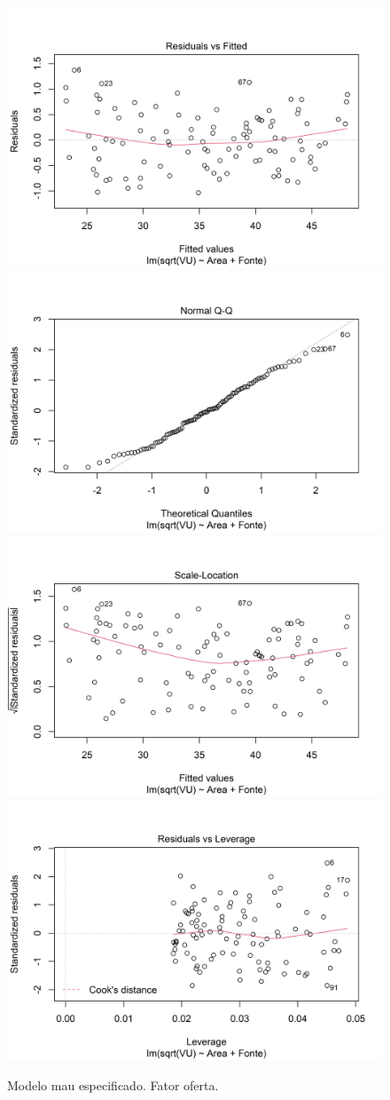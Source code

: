 \documentclass{article}
\begin{document}
\begin{figure}[H]
\includegraphics[width=0.5\linewidth]{./images/fit3Diagnostics-1} \includegraphics[width=0.5\linewidth]{./images/fit3Diagnostics-2} \includegraphics[width=0.5\linewidth]{./images/fit3Diagnostics-3} \includegraphics[width=0.5\linewidth]{./images/fit3Diagnostics-4} \caption{Modelo mau especificado. Fator oferta.}\label{fig:fit3Diagnostics}
\end{figure}
\end{document}
